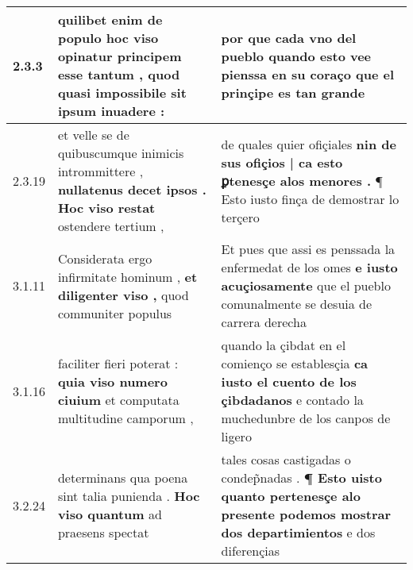 \begin{tabular}{|p{1cm}|p{6.5cm}|p{6.5cm}|}

\hline
2.3.3 & quilibet enim de populo \textbf{ hoc viso opinatur } principem esse tantum , quod quasi impossibile sit ipsum inuadere : & por que cada vno del pueblo \textbf{ quando esto vee pienssa en su coraço } que el prinçipe es tan grande \\\hline
2.3.19 & et velle se de quibuscumque inimicis intrommittere , \textbf{ nullatenus decet ipsos . Hoc viso restat } ostendere tertium , & de quales quier ofiçiales \textbf{ nin de sus ofiçios | ca esto ꝑtenesçe alos menores . } ¶ Esto iusto finça de demostrar lo terçero \\\hline
3.1.11 & Considerata ergo infirmitate hominum , \textbf{ et diligenter viso , } quod communiter populus & Et pues que assi es penssada la enfermedat de los omes \textbf{ e iusto acuçiosamente } que el pueblo comunalmente se desuia de carrera derecha \\\hline
3.1.16 & faciliter fieri poterat : \textbf{ quia viso numero ciuium } et computata multitudine camporum , & quando la çibdat en el comienço se establesçia \textbf{ ca iusto el cuento de los çibdadanos } e contado la muchedunbre de los canpos de ligero \\\hline
3.2.24 & determinans qua poena sint talia punienda . \textbf{ Hoc viso quantum } ad praesens spectat & tales cosas castigadas o condep̃nadas . \textbf{ ¶ Esto uisto quanto pertenesçe alo presente podemos mostrar dos departimientos } e dos diferençias \\\hline

\end{tabular}
